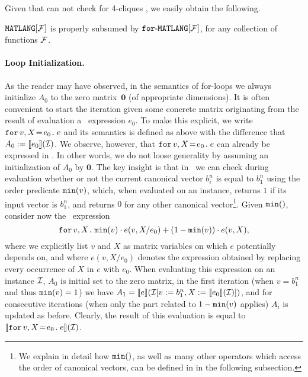 Given that \lang can not check for 4-cliques \cite{matlang-journal}, we easily obtain the following.

\begin{proposition}
\label{cor-ml-fml}
$\langf{\Fun}$ is properly subsumed by $\langforf{\Fun}$, for any collection of functions $\Fun$.
\end{proposition} 

%
%

\paragraph{Loop Initialization.} As the reader may have observed, in the semantics of for-loops we 
always initialize $A_0$ to the zero matrix~$\mathbf{0}$ (of appropriate dimensions). It is often convenient
to start the iteration given some concrete matrix  originating from the result of evaluation a \langfor\ expression $e_0$. To make this explicit, we write $\initf{e_0}{v}{X}{e}$ and its semantics is defined as above
with the difference that $A_0:=\sem{e_0}{\I}$. We observe, however, that $\initf{e_0}{v}{X}{e}$ can already
be expressed in \langfor. In other words, we do not loose generality by assuming an initialization of $A_0$ by $\mathbf{0}$.
The key insight is that in \langfor\ we can check during evaluation whether or not
the current canonical vector $b_i^n$ is equal to $b_1^n$ using the order predicate $\mmin{v}$, which, when evaluated on an instance, returns $1$ if its input vector is $b_1^n$, and returns $0$ for any other canonical vector\footnote{We explain in detail how $\mmin$, as well as many other operators which access the order of canonical vectors, can be defined in \langfor in the following subsection.}. Given $\mmin$, consider now the
\langfor\ expression
 $$\ffor{v}{X}{\mmin{v}\cdot e(v,X/e_0) + (1-\mmin{v})\cdot e(v,X)},$$
 where we explicitly list $v$ and $X$ as matrix variables on which $e$ potentially depends on, and where
 $e(v,X/e_0)$ denotes the expression obtained by replacing every occurrence of $X$ in $e$ with $e_0$.
When evaluating this expression on an instance $\I$, $A_0$ is initial set to the zero matrix, in the first iteration (when  $v=b_1^n$ and thus $\mmin{v}=1$)
we have $A_1=\sem{e}{\I[v:=b_1^n,X:=\sem{e_0}{\I}]}$, and for consecutive iterations (when only the part related to $1-\mmin{v}$ applies) $A_i$ is updated as before. Clearly, the result of this evaluation is equal to
$\sem{\initf{e_0}{v}{X}{e}}{\I}$.


